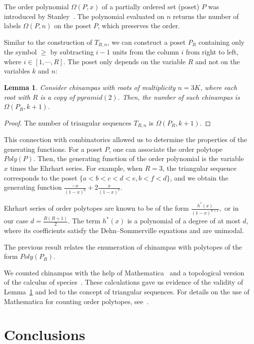 \documentclass[a4paper]{article}\usepackage[english]{babel}
\newtheorem{lemma}[theorem]{Lemma}
\theoremstyle{definition}
\newcommand{\apyr}[1][l]{\ensuremath{pyramid(#1)}}
\begin{document}
The order polynomial $\Omega(P, x)$ of a partially ordered set (poset) $P$ was introduced by Stanley~\cite{beginning}. The polynomial evaluated on $n$ returns the number of labels $\Omega(P, n)$ on the poset $P$, which preserves the order. 

Similar to the construction of $T_{R, n}$, we can construct a poset $P_{R}$ containing only the symbol $\geq$ by subtracting $i-1$ units from the column $i$ from right to left, where $i\in[1,\cdots, R]$. The poset only depends on the variable $R$ and not on the variables $k$ and $n$:

\begin{lemma} \label{prop:geom2}
Consider chinampas with roots of multiplicity $n=3K$, where each root with $R$ is a copy of $\apyr[2]$. Then, the number of such chinampas is $\Omega(P_{R}, k+1)$.
\end{lemma}

\begin{proof}
The number of triangular sequences $T_{R, n}$ is $\Omega(P_{R}, k+1)$.
\end{proof}

This connection with combinatorics allowed us to determine the properties of the generating functions. For a poset $P$, one can associate the order polytope~\cite{computingd, crt} $Poly(P)$. Then, the generating function of the order polynomial is the variable $x$ times the Ehrhart series. For example, when $R=3$, the triangular sequence corresponds to the poset $\{a<b<c<d<e, b<f<d\}$, and we obtain the generating function $\frac{-x}{(1-x)^6}+2\frac{x}{(1-x)^{7}}$.

Ehrhart series of order polytopes are known to be of the form $\frac{h^*(x)}{(1-x)^{d+1}},$ or in our case $ d=\frac{R(R+1)}{2}$. The term $h^*(x)$ is a polynomial of a degree of at most $d$, where its coefficients satisfy the Dehn--Sommerville equations and are unimodal.

The previous result relates the enumeration of chinampas with polytopes of the form $Poly(P_{R})$. 

We counted chinampas with the help of Mathematica~\cite{Mmica} and a topological version of the calculus of species~\cite{poset}. These calculations gave us evidence of the validity of Lemma~\ref{prop:geom2} and led to the concept of triangular sequences. For details on the use of Mathematica for counting order polytopes, see~\cite{note}.

\section{Conclusions}
\end{document}
